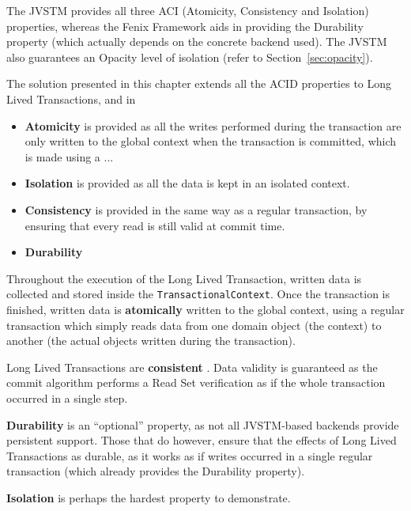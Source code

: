 The JVSTM provides all three ACI (Atomicity, Consistency and
Isolation) properties, whereas the Fenix Framework aids in providing
the Durability property (which actually depends on the concrete
backend used). The JVSTM also guarantees an Opacity level of
isolation (refer to Section~\ref{sec:opacity}).

The solution presented in this chapter extends all the ACID properties
to Long Lived Transactions, and in 



\begin{itemize}

\item {\bf Atomicity} is provided as all the writes performed during
  the transaction are only written to the global context when the
  transaction is committed, which is made using a ...

\item {\bf Isolation} is provided as all the data is kept in an
  isolated context.

\item {\bf Consistency} is provided in the same way as a regular
  transaction, by ensuring that every read is still valid at commit
  time.

\item {\bf Durability} 

\end{itemize}

Throughout the execution of the Long Lived Transaction, written data
is collected and stored inside the \texttt{TransactionalContext}. Once
the transaction is finished, written data is {\bf atomically} written
to the global context, using a regular transaction which simply reads
data from one domain object (the context) to another (the actual
objects written during the transaction).

Long Lived Transactions are {\bf consistent} . Data validity is
guaranteed as the commit algorithm performs a Read Set verification as
if the whole transaction occurred in a single step.

{\bf Durability} is an ``optional'' property, as not all JVSTM-based
backends provide persistent support. Those that do however, ensure
that the effects of Long Lived Transactions as durable, as it works as
if writes occurred in a single regular transaction (which already
provides the Durability property).

{\bf Isolation} is perhaps the hardest property to demonstrate.



